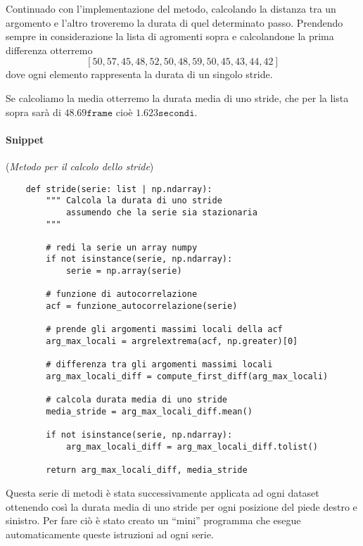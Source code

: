 Continuado con l'implementazione del metodo, calcolando la distanza tra un argomento e l'altro troveremo
la durata di quel determinato passo. Prendendo sempre in considerazione la lista di agromenti sopra
e calcolandone la prima differenza otterremo
\[[50, 57, 45, 48, 52, 50, 48, 59, 50, 45, 43, 44, 42]\]
dove ogni elemento rappresenta la durata di un singolo stride.

Se calcoliamo la media otterremo la durata media di uno stride, che per la lista sopra sarà di 
$48.69\texttt{frame}$ cioè $1.623\texttt{secondi}$.


\paragraph{Snippet} (\textit{Metodo per il calcolo dello stride})
\begin{verbatim}
    def stride(serie: list | np.ndarray):
        """ Calcola la durata di uno stride
            assumendo che la serie sia stazionaria    
        """

        # redi la serie un array numpy
        if not isinstance(serie, np.ndarray):
            serie = np.array(serie)
        
        # funzione di autocorrelazione
        acf = funzione_autocorrelazione(serie)

        # prende gli argomenti massimi locali della acf
        arg_max_locali = argrelextrema(acf, np.greater)[0]

        # differenza tra gli argomenti massimi locali
        arg_max_locali_diff = compute_first_diff(arg_max_locali)

        # calcola durata media di uno stride
        media_stride = arg_max_locali_diff.mean()

        if not isinstance(serie, np.ndarray):
            arg_max_locali_diff = arg_max_locali_diff.tolist()

        return arg_max_locali_diff, media_stride

\end{verbatim}


Questa serie di metodi è stata successivamente applicata ad ogni dataset ottenendo così la durata
media di uno stride per ogni posizione del piede destro e sinistro. Per fare ciò è stato creato
un ``mini'' programma che esegue automaticamente queste istruzioni ad ogni serie.

